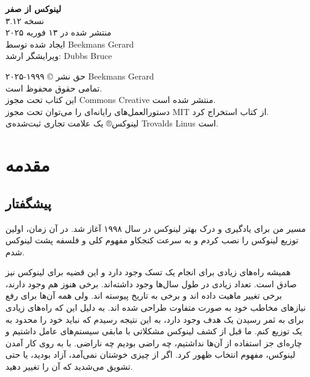 \documentclass{book}
\begin{document}
\begin{center}
	\textbf{لینوکس از صفر} \\ 
نسخه ۳.۱۲ \\ 	
منتشر شده در ۱۳ فوریه ۲۰۲۵ \\ 	
ایجاد شده توسط Beekmans Gerard \\ 	
ویرایشگر ارشد: Dubbs Bruce \\ 	
\end{center}


\newpage

\begin{center}
حق نشر © ۱۹۹۹-۲۰۲۵ Beekmans Gerard \\	
تمامی حقوق محفوظ است. \\ 	
این کتاب تحت مجوز Commons Creative منتشر شده است. \\ 	
دستورالعمل‌های رایانه‌ای را می‌توان تحت مجوز MIT از کتاب استخراج کرد. \\ 	
لینوکس® یک علامت تجاری ثبت‌شده‌ی Trovalds Linus است.\\	
\end{center}



\chapter{مقدمه}



\newpage

\section{پیشگفتار}

\par
مسیر من برای یادگیری و درک بهتر لینوکس در سال ۱۹۹۸ آغاز شد. در آن زمان، اولین توزیع لینوکس را نصب کردم و به سرعت کنجکاو مفهوم کلی و فلسفه پشت لینوکس شدم.
\newline

\par
همیشه راه‌های زیادی برای انجام یک تسک وجود دارد و این قضیه برای لینوکس نیز صادق است. تعداد زیادی در طول سال‌ها وجود داشته‌اند. برخی هنوز هم وجود دارند، برخی تغییر ماهیت داده اند و برخی به تاریخ پیوسته اند. ولی همه آن‌ها برای رفع نیاز‌های مخاطب خود به صورت متفاوت طراحی شده اند. به دلیل این که راه‌های زیادی برای به ثمر رسیدن یک هدف وجود دارد، به این نتیجه رسیدم که نباید خود را محدود به یک توزیع کنم. ما قبل از کشف لینوکس مشکلاتی با مابقی سیستم‌های عامل داشتیم و چاره‌ای جز استفاده از آن‌ها نداشتیم، چه راضی بودیم چه ناراضی. با به روی کار آمدن لینوکس، مفهوم انتخاب ظهور کرد. اگر از چیزی خوشتان نمی‌آمد، آزاد بودید، یا حتی تشویق می‌شدید که آن را تغییر دهید.
\newline
\end{document}

